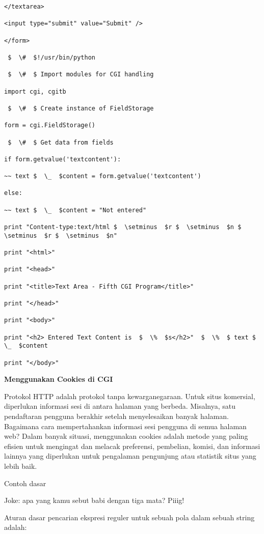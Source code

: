 \begin {enumerate}
\begin {enumerate}
\begin{verbatim}
</textarea>

<input type="submit" value="Submit" />

</form>

 $  \#  $!/usr/bin/python

 $  \#  $ Import modules for CGI handling

import cgi, cgitb

 $  \#  $ Create instance of FieldStorage

form = cgi.FieldStorage()

 $  \#  $ Get data from fields

if form.getvalue('textcontent'):

~~ text $  \_  $content = form.getvalue('textcontent')

else:

~~ text $  \_  $content = "Not entered"

print "Content-type:text/html $  \setminus  $r $  \setminus  $n $  \setminus  $r $  \setminus  $n"

print "<html>"

print "<head>"

print "<title>Text Area - Fifth CGI Program</title>"

print "</head>"

print "<body>"

print "<h2> Entered Text Content is  $  \%  $s</h2>"  $  \%  $ text $  \_  $content

print "</body>"

\end{verbatim}

{\fontsize{14pt}{14pt}\selectfont \textbf{Menggunakan Cookies di CGI} \\}

Protokol HTTP adalah protokol tanpa kewarganegaraan. Untuk situs komersial, diperlukan informasi sesi di antara halaman yang berbeda. Misalnya, satu pendaftaran pengguna berakhir setelah menyelesaikan banyak halaman. Bagaimana cara mempertahankan informasi sesi pengguna di semua halaman web? Dalam banyak situasi, menggunakan cookies adalah metode yang paling efisien untuk mengingat dan melacak preferensi, pembelian, komisi, dan informasi lainnya yang diperlukan untuk pengalaman pengunjung atau statistik situs yang lebih baik.

Contoh dasar

Joke: apa yang kamu sebut babi dengan tiga mata? Piiig!

Aturan dasar pencarian ekspresi reguler untuk sebuah pola dalam sebuah string adalah:


\end{enumerate}
\end{enumerate}
